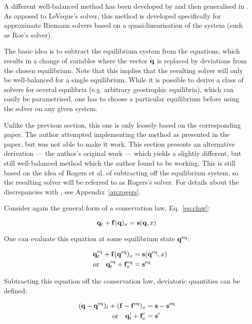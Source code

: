 A different well-balanced method has been developed by \citet{rogers2001adaptive} and then generalised in \cite{rogers2003mathematical}. As opposed to LeVeque's solver, this method is developed specifically for approximate Riemann solvers based on a quasi-linearisation of the system (such as Roe's solver).

The basic idea is to subtract the equilibrium system from the equations, which results in a change of variables where the vector $\vb q$ is replaced by deviations from the chosen equilibrium. Note that this implies that the resulting solver will only be well-balanced for a single equilibrium. While it is possible to derive a class of solvers for several equilibria (e.g. arbitrary geostrophic equilibria), which can easily be parametrised, one has to choose a particular equilibrium before using the solver on any given system.

Unlike the previous section, this one is only loosely based on the corresponding paper. The author attempted implementing the method as presented in the paper, but was not able to make it work. This section presents an alternative derivation --- the author's original work --- which yields a slightly different, but still well-balanced method which the author found to be working. This is still based on the idea of Rogers et al. of subtracting off the equilibrium system, so the resulting solver will be referred to as Rogers's solver. For details about the discrepancies with \cite{rogers2003mathematical}, see Appendix~\ref{ap:rogers}.

Consider again the general form of a conservation law, Eq.~\ref{eq:claw}:

$$
  \vb q_t + \vb f(\vb q)_x = \vb s(\vb q, x)
$$

One can evaluate this equation at some equilibrium state $\vb q^\mathrm{eq}$:

\begin{align}
  \eq{\vb q}_t + \vb f(\eq{\vb q})_x &= \vb s(\eq{\vb q}, x) \\
  \qq{or} \eq{\vb q}_t + \eq{\vb f}_x &= \eq{\vb s}
\end{align}

Subtracting this equation off the conservation law, deviatoric quantities can be defined:

\begin{align}
  (\vb q - \eq{\vb q})_t + (\vb f - \eq{\vb f})_x &= \vb s - \eq{\vb s} \\
  \qq{or} \vb q'_t + \vb f'_x &= \vb s'
\end{align}

